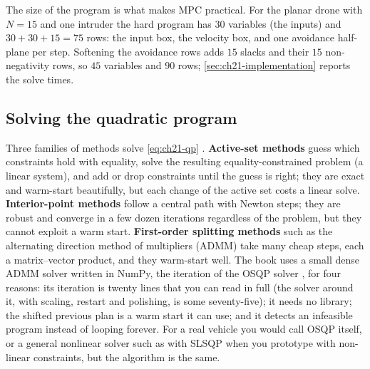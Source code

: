 The size of the program is what makes MPC practical. For the planar drone
with $N=15$ and one intruder the hard program has $30$ variables (the inputs)
and $30+30+15=75$ rows: the input box, the velocity box, and one avoidance
half-plane per step. Softening the avoidance rows adds $15$ slacks and their
$15$ non-negativity rows, so $45$ variables and $90$ rows;
\cref{sec:ch21-implementation} reports the solve times.

\subsection{Solving the quadratic program}
\label{sec:ch21-solver}

Three families of methods solve \cref{eq:ch21-qp}
\cite{boyd2004convex,rawlings2017mpc}. \textbf{Active-set
methods} guess which constraints
hold with equality, solve the resulting equality-constrained problem (a
linear system), and add or drop constraints until the guess is right; they are
exact and warm-start beautifully, but each change of the active set costs a
linear solve. \textbf{Interior-point methods}
follow a central path with Newton steps; they are robust and converge in a
few dozen iterations regardless of the problem, but they cannot exploit a
warm start. \textbf{First-order splitting methods}
such as the alternating direction method of multipliers (ADMM)
\cite{boyd2011admm} take many cheap steps, each a matrix--vector product,
and they warm-start well. The book uses a small dense ADMM solver written in
NumPy, the iteration of the OSQP solver \cite{stellato2020osqp}, for four
reasons: its iteration is twenty lines that you can read in full (the solver
around it, with scaling, restart and polishing, is some seventy-five); it
needs no library;
the shifted previous plan is a warm start it can use; and it detects an
infeasible program instead of looping forever. For a real vehicle you would
call OSQP itself, or a general nonlinear solver such as
 with SLSQP when you prototype with non-linear
constraints, but the algorithm is the same.

